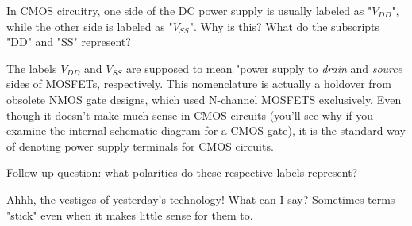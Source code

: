 

In CMOS circuitry, one side of the DC power supply is usually labeled as "$V_{DD}$", while the other side is labeled as "$V_{SS}$".  Why is this?  What do the subscripts "DD" and "SS" represent?







The labels $V_{DD}$ and $V_{SS}$ are supposed to mean "power supply to {\it drain} and {\it source} sides of MOSFETs, respectively.  This nomenclature is actually a holdover from obsolete NMOS gate designs, which used N-channel MOSFETS exclusively.  Even though it doesn't make much sense in CMOS circuits (you'll see why if you examine the internal schematic diagram for a CMOS gate), it is the standard way of denoting power supply terminals for CMOS circuits.

\vskip 10pt

Follow-up question: what polarities do these respective labels represent?







Ahhh, the vestiges of yesterday's technology!  What can I say?  Sometimes terms "stick" even when it makes little sense for them to.




